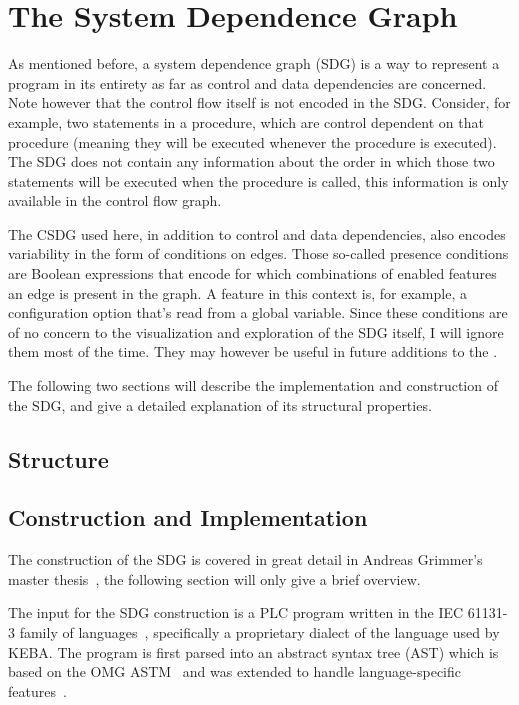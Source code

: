 \chapter{The System Dependence Graph} \label{ch:sdg}

As mentioned before, a system dependence graph (SDG) is a way to represent a program in its entirety as far as control 
and data dependencies are concerned. Note however that the control flow itself is not encoded in the SDG. Consider, for 
example, two statements in a procedure, which are control dependent on that procedure (meaning they will be executed 
whenever the procedure is executed). The SDG does not contain any information about the order in which those two 
statements will be executed when the procedure is called, this information is only available in the control flow graph.

The CSDG used here, in addition to control and data dependencies, also encodes variability in the form of conditions on 
edges. Those so-called presence conditions are Boolean expressions that encode for which combinations of enabled 
features an edge is present in the graph. A feature in this context is, for example, a configuration option that's read 
from a global variable. Since these conditions are of no concern to the visualization and exploration of the SDG 
itself, I will ignore them most of the time. They may however be useful in future additions to the \SB.

The following two sections will describe the implementation and construction of the SDG, and give a detailed 
explanation of its structural properties.


\section{Structure}



\section{Construction and Implementation}

The construction of the SDG is covered in great detail in Andreas Grimmer's master thesis~\cite{GrimmerDA}, the 
following section will only give a brief overview.

The input for the SDG construction is a PLC program written in the IEC 61131-3 family of 
languages~\cite{IEC61131:2003}, specifically a proprietary dialect of the language used by KEBA. The program is first 
parsed into an abstract syntax tree (AST) which is based on the OMG ASTM~\cite{ASTM} and was extended to handle 
language-specific features~\cite[ch.~4]{GrimmerDA}. 

